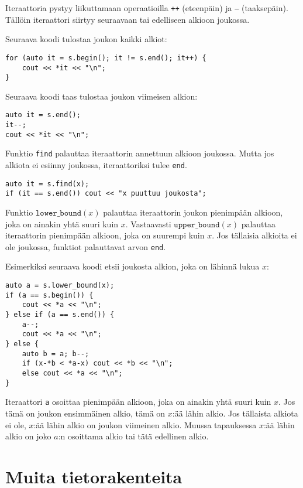 Iteraattoria pystyy liikuttamaan
operaatioilla \texttt{++} (eteenpäin)
ja \texttt{---} (taaksepäin).
Tällöin iteraattori siirtyy seuraavaan
tai edelliseen alkioon joukossa.

Seuraava koodi tulostaa joukon kaikki alkiot:

\begin{lstlisting}
for (auto it = s.begin(); it != s.end(); it++) {
    cout << *it << "\n";
}
\end{lstlisting}
Seuraava koodi taas tulostaa joukon
viimeisen alkion:

\begin{lstlisting}
auto it = s.end();
it--;
cout << *it << "\n";
\end{lstlisting}

Funktio \texttt{find} palauttaa iteraattorin
annettuun alkioon joukossa.
Mutta jos alkiota ei esiinny joukossa,
iteraattoriksi tulee \texttt{end}.

\begin{lstlisting}
auto it = s.find(x);
if (it == s.end()) cout << "x puuttuu joukosta";
\end{lstlisting}

Funktio $\texttt{lower\_bound}(x)$ palauttaa
iteraattorin joukon pienimpään alkioon,
joka on ainakin yhtä suuri kuin $x$.
Vastaavasti $\texttt{upper\_bound}(x)$ palauttaa
iteraattorin pienimpään alkioon,
joka on suurempi kuin $x$.
Jos tällaisia alkioita ei ole joukossa,
funktiot palauttavat arvon \texttt{end}.

Esimerkiksi seuraava koodi etsii joukosta
alkion, joka on lähinnä lukua $x$:

\begin{lstlisting}
auto a = s.lower_bound(x);
if (a == s.begin()) {
    cout << *a << "\n";
} else if (a == s.end()) {
    a--;
    cout << *a << "\n";
} else {
    auto b = a; b--;
    if (x-*b < *a-x) cout << *b << "\n";
    else cout << *a << "\n";
}
\end{lstlisting}
Iteraattori \texttt{a}
osoittaa pienimpään alkioon,
joka on ainakin yhtä suuri kuin $x$.
Jos tämä on joukon ensimmäinen alkio,
tämä on $x$:ää lähin alkio.
Jos tällaista alkiota ei ole,
$x$:ää lähin alkio on joukon viimeinen alkio.
Muussa tapauksessa $x$:ää lähin alkio
on joko $a$:n osoittama alkio tai tätä edellinen alkio.

\section{Muita tietorakenteita}

